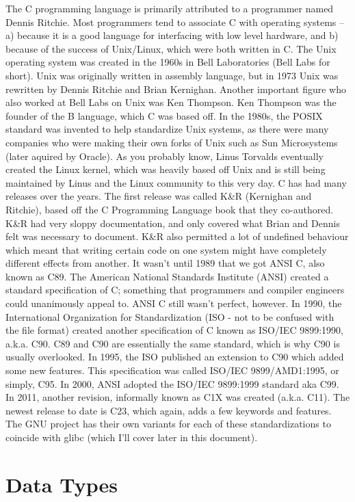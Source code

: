 \documentclass{article}
\begin{document}
The C programming language is primarily attributed to a programmer named Dennis Ritchie. Most programmers tend
to associate C with operating systems – a) because it is a good language for interfacing with low level
hardware, and b) because of the success of Unix/Linux, which were both written in C. The Unix operating system
was created in the 1960s in Bell Laboratories (Bell Labs for short). Unix was originally written in assembly
language, but in 1973 Unix was rewritten by Dennis Ritchie and Brian Kernighan. Another important figure who
also worked at Bell Labs on Unix was Ken Thompson. Ken Thompson was the founder of the B language, which C
was based off. In the 1980s, the POSIX standard was invented to help standardize Unix systems, as there were
many companies who were making their own forks of Unix such as Sun Microsystems (later aquired by Oracle). As
you probably know, Linus Torvalds eventually created the Linux kernel, which was heavily based off Unix and is
still being maintained by Linus and the Linux community to this very day. C has had many releases over the
years. The first release was called K\&R (Kernighan and Ritchie), based off the C Programming Language book
that they co-authored. K\&R had very sloppy documentation, and only covered what Brian and Dennis felt was
necessary to document. K\&R also permitted a lot of undefined behaviour which meant that writing certain code
on one system might have completely different effects from another. It wasn’t until 1989 that we got ANSI C,
also known as C89. The American National Standards Institute (ANSI) created a standard specification of C;
something that programmers and compiler engineers could unanimously appeal to. ANSI C still wasn’t perfect,
however. In 1990, the International Organization for Standardization (ISO - not to be confused with the file
format) created another specification of C known as ISO/IEC 9899:1990, a.k.a. C90. C89 and C90 are essentially
the same standard, which is why C90 is usually overlooked. In 1995, the ISO published an extension to C90
which added some new features. This specification was called ISO/IEC 9899/AMD1:1995, or simply, C95. In 2000,
ANSI adopted the ISO/IEC 9899:1999 standard aka C99. In 2011, another revision, informally known as C1X was
created (a.k.a. C11). The newest release to date is C23, which again, adds a few keywords and features. The
GNU project has their own variants for each of these standardizations to coincide with glibc (which I’ll cover
later in this document).

\section{Data Types}
\end{document}
